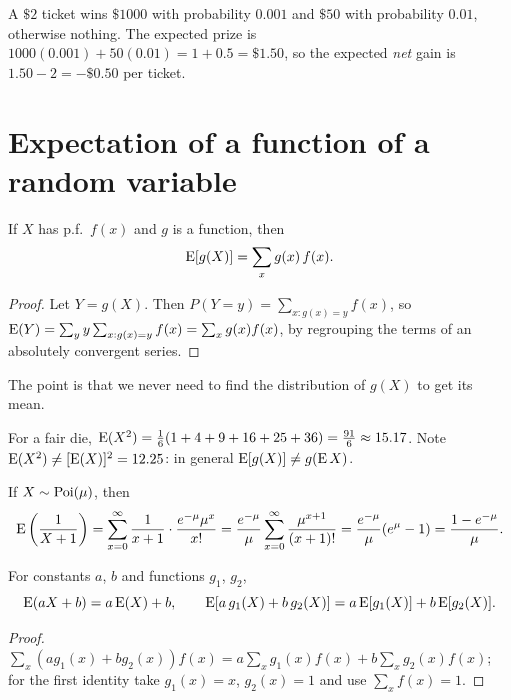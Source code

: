 \begin{example}[Lottery]
A $\$2$ ticket wins $\$1000$ with probability $0.001$ and $\$50$ with probability
$0.01$, otherwise nothing. The expected prize is
$1000(0.001) + 50(0.01) = 1 + 0.5 = \$1.50$, so the expected \emph{net} gain is
$1.50 - 2 = -\$0.50$ per ticket.
\end{example}

\section{Expectation of a function of a random variable}

\begin{theorem}
If $X$ has p.f.\ $f(x)$ and $g$ is a function, then
\[
  \operatorname{E}[g(X)] = \sum_x g(x)\,f(x).
\]
\end{theorem}

\begin{proof}
Let $Y = g(X)$. Then $P(Y = y) = \sum_{x : g(x) = y} f(x)$, so
$\operatorname{E}(Y) = \sum_y y \sum_{x: g(x) = y} f(x) = \sum_x g(x) f(x)$, by regrouping the terms
of an absolutely convergent series.
\end{proof}

The point is that we never need to find the distribution of $g(X)$ to get its mean.

\begin{example}
For a fair die, $\operatorname{E}(X^2) = \frac16(1+4+9+16+25+36) = \frac{91}{6} \approx 15.17$. Note
$\operatorname{E}(X^2) \ne [\operatorname{E}(X)]^2 = 12.25$: in general $\operatorname{E}[g(X)] \ne g(\operatorname{E} X)$.
\end{example}

\begin{example}
If $X\sim\operatorname{Poi}(\mu)$, then
\[
  \operatorname{E}\left(\frac{1}{X+1}\right) = \sum_{x=0}^\infty \frac{1}{x+1}\cdot\frac{e^{-\mu}\mu^x}{x!}
  = \frac{e^{-\mu}}{\mu}\sum_{x=0}^\infty \frac{\mu^{x+1}}{(x+1)!}
  = \frac{e^{-\mu}}{\mu}(e^{\mu} - 1) = \frac{1 - e^{-\mu}}{\mu}.
\]
\end{example}

\begin{theorem}[Linearity]
For constants $a$, $b$ and functions $g_1$, $g_2$,
\[
  \operatorname{E}(aX + b) = a\operatorname{E}(X) + b, \qquad \operatorname{E}[a\,g_1(X) + b\,g_2(X)] = a\operatorname{E}[g_1(X)] + b\operatorname{E}[g_2(X)].
\]
\end{theorem}

\begin{proof}
$\sum_x (a g_1(x) + b g_2(x)) f(x) = a\sum_x g_1(x)f(x) + b \sum_x g_2(x)f(x)$; for the
first identity take $g_1(x) = x$, $g_2(x) = 1$ and use $\sum_x f(x) = 1$.
\end{proof}

